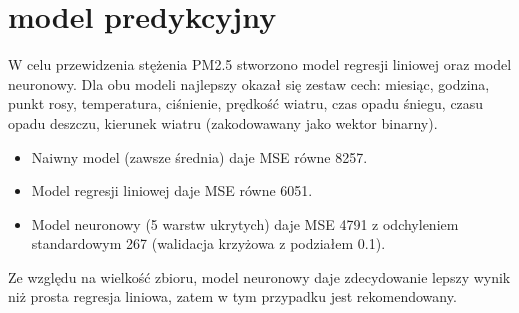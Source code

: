 \documentclass{beamer}
\begin{document}
\section{model predykcyjny}
\begin{frame}
	W celu przewidzenia stężenia PM2.5 stworzono model regresji liniowej oraz model neuronowy. Dla obu modeli najlepszy okazał się zestaw cech:
	miesiąc, godzina, punkt rosy, temperatura, ciśnienie, prędkość wiatru, czas opadu śniegu, czasu opadu deszczu, kierunek wiatru (zakodowawany jako wektor binarny).
	\begin{itemize}
		\item Naiwny model (zawsze średnia) daje MSE równe 8257.
		\item Model regresji liniowej daje MSE równe 6051.
		\item Model neuronowy (5 warstw ukrytych) daje MSE 4791 z odchyleniem standardowym 267 (walidacja krzyżowa z podziałem 0.1).
	\end{itemize}
	Ze względu na wielkość zbioru, model neuronowy daje zdecydowanie lepszy wynik niż prosta regresja liniowa,
	zatem w tym przypadku jest rekomendowany.
\end{frame}
\end{document}
